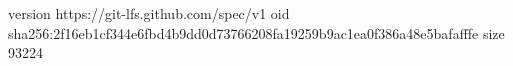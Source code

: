 version https://git-lfs.github.com/spec/v1
oid sha256:2f16eb1cf344e6fbd4b9dd0d73766208fa19259b9ac1ea0f386a48e5bafafffe
size 93224
